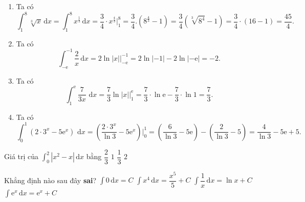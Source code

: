 \begin{bt}
{\begin{enumerate}
			\item Ta  có \[\displaystyle\int_1^8{\sqrt[3]x}\mathrm{\,d}x=\displaystyle\int_1^8{{x^{\tfrac13}}}\mathrm{\,d}x=\dfrac34\cdot{x^{\tfrac43}} \Bigg|_1^8=\dfrac34.\left({8^{\tfrac43}}-1\right)=\dfrac34\left(\sqrt[3]{8^4}-1\right)=\dfrac34\cdot\left(16-1\right)=\dfrac{45}4.\]
			 \item Ta có \[\displaystyle\int_{-\mathrm e}^{-1}{\dfrac2x\mathrm{\,d}x=2\ln|x |\Bigg|_{-\mathrm e}^{-1}}=2\ln|-1 |-2\ln|-\mathrm e|=-2.\]
			\item Ta có \[\displaystyle\int_1^{\mathrm e}{\dfrac7{3x}\,\mathrm{\,d}x}=\dfrac73\ln|x |\Bigg|_1^{\mathrm e}=\dfrac73\cdot\ln\mathrm  e-\dfrac73\cdot\ln 1=\dfrac73.\]
			\item Ta có \[\displaystyle\int_0^1{\left({{2\cdot3}^x}-5{\mathrm{e}^x}\right)\,\mathrm{\,d}x}=\left(\dfrac{2\cdot3^x}{\ln 3}-5{\mathrm{e}^x}\right) \Bigg|_0^1=\left(\dfrac6{\ln 3}-5\mathrm  e\right)-\left(\dfrac2{\ln 3}-5\right)=\dfrac4{\ln 3}-5\mathrm e+5.\]
		\end{enumerate}
	} 
\end{bt}

\begin{ex}%
	Giá  trị của $\displaystyle\int_{0}^{2}|x^2-x|\mathrm{\,d}x$ bằng
	\choice 
		{$\dfrac{2}{3}$} 
		{\True $1$} 
		{$\dfrac{1}{3}$} 
		{$2$} 
\end{ex}

\begin{ex}%
	Khẳng định nào sau đây {\bf{sai}}? 
	\choice 
		{$\displaystyle\int 0\mathrm{\,d}x=C$} 
		{$\displaystyle\int x^4\mathrm{\,d}x=\dfrac{x^5}{5}+C$} 
		 {\True $\displaystyle\int \dfrac{1}{x} \mathrm{\,d}x=\ln x+C$}
		{$\displaystyle\int \mathrm{e}^x \mathrm{\,d}x=\mathrm{e}^x+C$} 
\end{ex}

